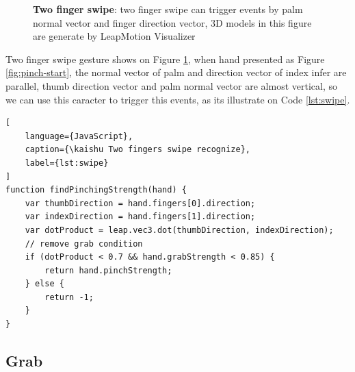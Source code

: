 \begin{figure}[H]
\kaishu
\centering
{}
\caption{\textbf{Two finger swipe}: two finger swipe can trigger events by palm normal vector and finger direction vector, 3D models in this figure are generate by LeapMotion Visualizer}
\label{fig:pinch}
\end{figure}


Two finger swipe gesture shows on Figure \ref{fig:pinch}, when hand  presented as Figure \ref{fig:pinch-start}, the normal vector of palm and direction vector of index infer are parallel, thumb direction vector and palm normal vector are almost vertical, so we can use this caracter to trigger this events, as its illustrate on Code \ref{lst:swipe}.

\begin{lstlisting}[
    language={JavaScript},
    caption={\kaishu Two fingers swipe recognize},
    label={lst:swipe}
]
function findPinchingStrength(hand) {
    var thumbDirection = hand.fingers[0].direction;
    var indexDirection = hand.fingers[1].direction;
    var dotProduct = leap.vec3.dot(thumbDirection, indexDirection);
    // remove grab condition
    if (dotProduct < 0.7 && hand.grabStrength < 0.85) {
        return hand.pinchStrength;
    } else {
        return -1;
    }
}
\end{lstlisting}

\subsection{Grab}

